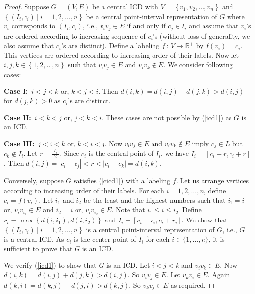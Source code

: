 \documentclass{article}
\theoremstyle{definition}
\numberwithin{equation}{section}
\newcommand{\To}{\longrightarrow}
\newcommand{\Map}[3]{#1\, :\, #2\To #3}
\newcommand{\Real}{\mathbb{R}}
\newcommand{\set}[1]{\left\{#1\right\}}
\newcommand{\Set}[2]{\set{#1\ \vert\ #2}}
\begin{document}
\begin{proof}
Suppose $G=(V,E)$ be a central ICD with $V=\set{v_1,v_2,\ldots,v_n}$ and\\
 $\Set{(I_i,c_i)}{i=1,2,\ldots,n}$ be a central point-interval representation of $G$ where $v_i$ corresponds to $(I_i,c_i)$, i.e., $v_iv_j\in E$ if and only if $c_j\in I_i$ and assume that $v_i$'s are ordered according to increasing sequence of $c_i$'s (without loss of generality, we also assume that $c_i$'s are distinct). Define a labeling $\Map{f}{V}{\Real^+}$ by $f(v_i)=c_i$. This vertices are ordered according to increasing order of their labels. Now let $i,j,k\in\set{1,2,\ldots,n}$ such that $v_iv_j\in E$ and $v_iv_k\not\in E$. We consider following cases:

\vspace{1em}\noindent
{\bf Case I:}\ $i<j<k$ or, $k<j<i$. Then $d(i,k)=d(i,j)+d(j,k)>d(i,j)$ for $d(j,k)>0$ as $c_i$'s are distinct.

\vspace{1em}\noindent
{\bf Case II:}\ $i<k<j$ or, $j<k<i$. These cases are not possible by (\ref{icd1}) as $G$ is an ICD.

\vspace{1em}\noindent
{\bf Case III:}\ $j<i<k$ or, $k<i<j$. Now $v_iv_j\in E$ and $v_iv_k\not\in E$ imply $c_j\in I_i$ but $c_k\not\in I_i$. Let $r=\frac{|I_i|}{2}$. Since $c_i$ is the central point of $I_i$, we have $I_i=[c_i-r,c_i+r]$. Then $d(i,j)=|c_i-c_j|<r<|c_i-c_k|=d(i,k)$.

\vspace{1em}\noindent 
Conversely, suppose $G$ satisfies (\ref{cicd1}) with a labeling $f$. Let us arrange vertices according to increasing order of their labels. For each $i=1,2,\ldots,n$, define $c_i=f(v_i)$. Let $i_1$ and $i_2$ be the least and the highest numbers such that $i_1=i$ or, $v_iv_{i_1}\in E$ and $i_2=i$ or, $v_iv_{i_2}\in E$. Note that $i_1\leqslant i\leqslant i_2$. Define $r_i=\max\set{d(i,i_1),d(i,i_2)}$ and $I_i=[c_i-r_i,c_i+r_i]$. We show that $\Set{(I_i,c_i)}{i=1,2,\ldots,n}$ is a central point-interval representation of $G$, i.e., $G$ is a central ICD. As $c_{i}$ is the center point of $I_{i}$ for each $i\in\{1,\hdots,n\}$, it is sufficient to prove that $G$ is an ICD.

\vspace{1em}\noindent
We verify (\ref{icd1}) to show that $G$ is an ICD. Let $i<j<k$ and $v_iv_k\in E$. Now $d(i,k)=d(i,j)+d(j,k)>d(i,j)$. So $v_{i}v_{j}\in E$. Let $v_kv_i\in E$. Again $d(k,i)=d(k,j)+d(j,i)>d(k,j)$. So $v_{k}v_{j}\in E$ as required.
\end{proof}
\end{document}
